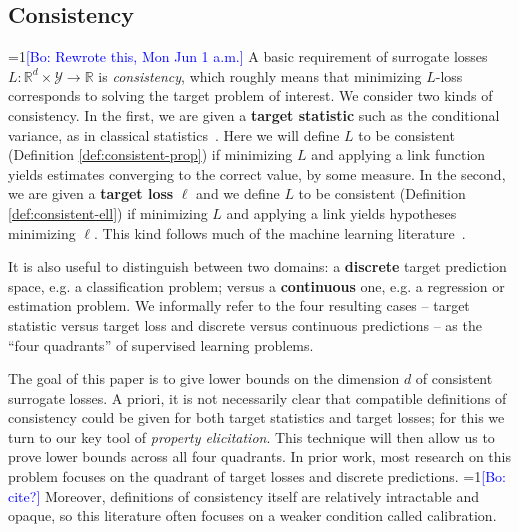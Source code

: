 \documentclass{article}
\newcommand{\Comments}{1}
\newcommand{\mynote}[2]{\ifnum\Comments=1\textcolor{#1}{#2}\fi}
\newcommand{\jessie}[1]{\mynote{purple}{[JF: #1]}}
\newcommand{\bo}[1]{\mynote{blue}{[Bo: #1]}}
\newcommand{\reals}{\mathbb{R}}
\newcommand{\Y}{\mathcal{Y}}
\begin{document}
\subsection{Consistency} \label{subsec:consistency}

\bo{Rewrote this, Mon Jun 1 a.m.}
A basic requirement of surrogate losses $L: \reals^d \times \Y \to \reals$ is \emph{consistency}, which roughly means that minimizing $L$-loss corresponds to solving the target problem of interest.
We consider two kinds of consistency.
In the first, we are given a \textbf{target statistic} such as the conditional variance, as in classical statistics~\citep{fisher1922mathematical}.
Here we will define $L$ to be consistent (Definition \ref{def:consistent-prop}) if minimizing $L$ and applying a link function yields estimates converging to the correct value, by some measure.
In the second, we are given a \textbf{target loss} $\ell$ and we define $L$ to be consistent (Definition \ref{def:consistent-ell}) if minimizing $L$ and applying a link yields hypotheses minimizing $\ell$.
This kind follows much of the machine learning literature~\citep{zhang2004statistical,bartlett2006convexity,tewari2007consistency,steinwart2007compare,ramaswamy2016convex}.

It is also useful to distinguish between two domains: a \textbf{discrete} target prediction space, e.g. a classification problem; versus a \textbf{continuous} one, e.g. a regression or estimation problem.
We informally refer to the four resulting cases -- target statistic versus target loss and discrete versus continuous predictions -- as the ``four quadrants'' of supervised learning problems.

The goal of this paper is to give lower bounds on the dimension $d$ of consistent surrogate losses.
A priori, it is not necessarily clear that compatible definitions of consistency could be given for both target statistics and target losses; for this we turn to our key tool of \emph{property elicitation}.
This technique will then allow us to prove lower bounds across all four quadrants.
In prior work, most research on this problem focuses on the quadrant of target losses and discrete predictions. \bo{cite?}
Moreover, definitions of consistency itself are relatively intractable and opaque, so this literature often focuses on a weaker condition called calibration.
\end{document}
